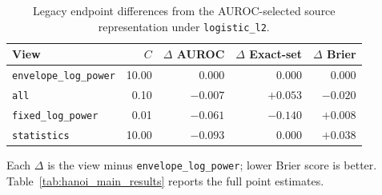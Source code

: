 \begin{table}[t]
\centering
\footnotesize
\setlength{\tabcolsep}{5pt}
\renewcommand{\arraystretch}{1.10}
\caption{Legacy endpoint differences from the AUROC-selected source representation under \texttt{logistic\_l2}.}
\label{tab:hanoi_view_ablation}
\begin{tabular}{lrrrr}
\toprule
View & $C$ & $\Delta$ AUROC & $\Delta$ Exact-set & $\Delta$ Brier \\
\midrule
\texttt{envelope\_log\_power} & 10.00 & 0.000 & 0.000 & 0.000 \\
\texttt{all} & 0.10 & $-0.007$ & $+0.053$ & $-0.020$ \\
\texttt{fixed\_log\_power} & 0.01 & $-0.061$ & $-0.140$ & $+0.008$ \\
\texttt{statistics} & 10.00 & $-0.093$ & 0.000 & $+0.038$ \\
\bottomrule
\end{tabular}
\vspace{0.4em}
\par\small\noindent
Each $\Delta$ is the view minus \texttt{envelope\_log\_power}; lower Brier score is better. Table~\ref{tab:hanoi_main_results} reports the full point estimates.
\end{table}
